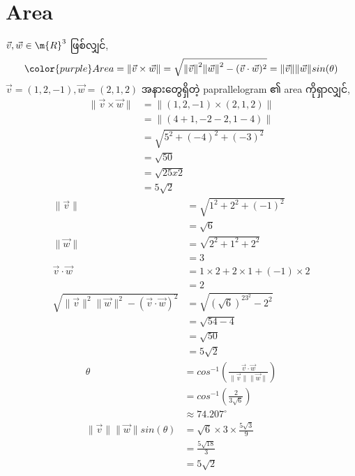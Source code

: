 \section{Area}
$\vec{v},\vec{w}\in\m{R}^3$ ဖြစ်လျှင်,
\begin{equation}
    {\color{purple}
        Area=\|\vec{v} \times \vec{w}\|=\sqrt{{\|\vec{v}\|}^2{\|\vec{w}\|}^2-(\vec{v}\cdot\vec{w})^2}=\|\vec{v}\|\|\vec{w}\|sin(\theta)
    }
\end{equation}
$\vec{v}=(1,2,-1),\vec{w}=(2,1,2)$ အနားတွေရှိတဲ့ paprallelogram ၏ area ကိုရှာလျှင်,
\[
    \begin{split}
        \|\vec{v}\times\vec{w}\|&=\| (1,2,-1)\times(2,1,2)\| \\
        &=\|(4+1,-2-2,1-4)\| \\
        &=\sqrt{5^2+(-4)^2+(-3)^2} \\
        &=\sqrt{50} \\
        &=\sqrt{25x2} \\
        &=5\sqrt{2}
    \end{split}
    \]\[\begin{split}
        \|\vec{v}\|&=\sqrt{1^2+2^2+(-1)^2} \\
        &=\sqrt{6} \\
        \|\vec{w}\|&=\sqrt{2^2+1^2+2^2} \\
        &=3 \\
        \vec{v}\cdot\vec{w}&=1 \times 2+2 \times 1+(-1) \times 2 \\
        &=2 \\
        \sqrt{\|\vec{v}\|^2\|\vec{w}\|^2-(\vec{v}\cdot\vec{w})^2}&=\sqrt{(\sqrt{6})^23^2-2^2} \\
        &=\sqrt{54-4} \\
        &=\sqrt{50} \\
        &=5\sqrt{2}
    \end{split}
\]
\[
    \begin{split}
        \theta&=cos^{-1}(\frac{\vec{v}\cdot\vec{w}}{\|\vec{v}\|\|\vec{w}\|}) \\
        &=cos^{-1}(\frac{2}{3\sqrt{6}}) \\
        &\approx74.207^{\circ} \\
        \|\vec{v}\|\|\vec{w}\|sin(\theta)&=\sqrt{6} \times 3 \times \frac{5\sqrt{3}}{9} \\
        &=\frac{5\sqrt{18}}{3} \\
        &=5\sqrt{2}
    \end{split}
\]